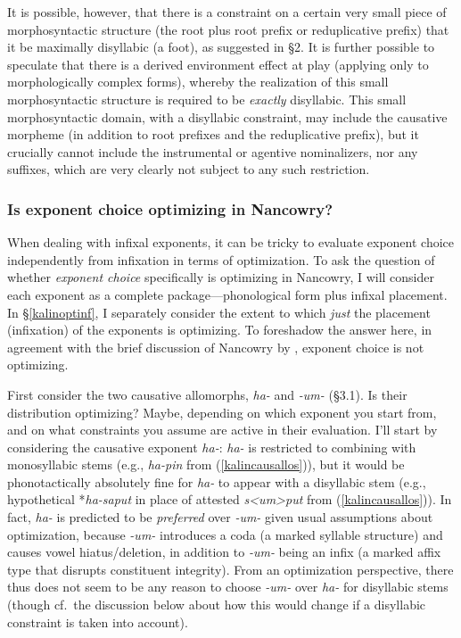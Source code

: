 \documentclass[output=paper,colorlinks,citecolor=brown,
]{langscibook}
\begin{document}
It is possible, however,  that there is a constraint on a certain very small piece of morphosyntactic structure (the root plus root prefix or reduplicative prefix) that it be maximally disyllabic (a foot), as suggested in \S2. It is further possible to speculate that there is a derived environment effect at play (applying only to morphologically complex forms),  whereby the realization of this small  morphosyntactic structure is required to be {\it exactly} disyllabic. This small morphosyntactic domain, with a disyllabic constraint, may include the causative morpheme (in addition to root prefixes and the reduplicative prefix), but it crucially cannot include the instrumental or agentive nominalizers, nor any suffixes, which are very clearly not subject to any such restriction.


\subsubsection{Is exponent choice optimizing in Nancowry?}

When dealing with infixal exponents, it can be tricky to evaluate exponent choice independently from infixation in terms of optimization. To ask the question of whether {\it exponent choice} specifically is optimizing in Nancowry, I will consider each exponent as a complete package---phonological form plus infixal placement. In \S\ref{kalinoptinf}, I separately consider the extent to which {\it just} the placement (infixation) of the exponents is optimizing. To foreshadow the answer here, in agreement with the brief discussion of Nancowry by \citet[167-168]{Paster06}, exponent choice is not optimizing.

First consider the two causative allomorphs, \textit{ha-} and \textit{-um-} (\S3.1). Is their distribution optimizing? Maybe, depending on which exponent you start from, and on what constraints you assume are active in their evaluation. I'll start by considering the causative exponent \textit{ha-}: \textit{ha-} is restricted to combining with monosyllabic stems (e.g., \textit{ha-pin} from (\ref{kalincausallos})), but it would be phonotactically absolutely fine for  \textit{ha-} to appear with a disyllabic stem (e.g., hypothetical *\textit{ha-saput} in place of attested \textit{s<um>put} from (\ref{kalincausallos})). In fact, \textit{ha-} is predicted to be {\it preferred} over \textit{-um-} given usual assumptions about optimization, because \textit{-um-} introduces a coda (a marked syllable structure) and causes vowel hiatus/deletion, in addition to \textit{-um-}  being an infix (a marked affix type that disrupts constituent integrity). From an optimization perspective, there thus does not seem to be any reason to choose \textit{-um-} over \textit{ha-} for disyllabic stems (though cf.\ the discussion below about how this would change if a disyllabic constraint is taken into account).
\end{document}
